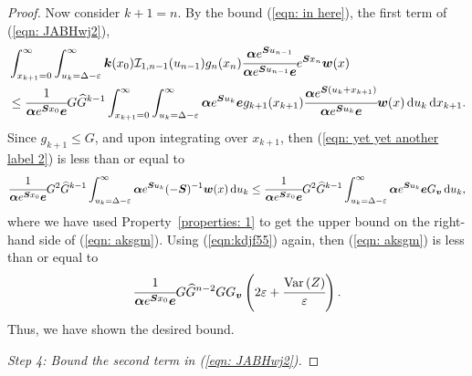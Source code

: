 \begin{proof}
		Now consider \(k+1=n\). By the bound (\ref{eqn: in here}), the first term of (\ref{eqn: JABHwj2}), 
		\begin{align}
			&\int_{x_{k+1}=0}^\infty \int_{u_k=\Delta-\varepsilon}^\infty \bs k(x_0)\mathcal I_{1,n-1}(u_{n-1}) g_{n}(x_{n})\cfrac{\bs \alpha e^{\bs{S}u_{n-1}}}{\bs \alpha e^{\bs{S}u_{n-1}}\bs e}e^{\bs{S}x_{n}}\bs w(x) %
			\\&\leq \cfrac{1}{\bs \alpha e^{\bs{S} x_0 }\bs e}G \widehat G^{k-1}
			\int_{x_{k+1}=0}^\infty \int_{u_k=\Delta-\varepsilon}^\infty \bs \alpha e^{\bs{S}u_k}\bs e g_{k+1}(x_{k+1}) \cfrac{\bs\alpha e^{\bs{S}(u_k+x_{k+1})}}{\bs \alpha e^{\bs{S}u_k}\bs e}\bs w(x)\wrt u_k \wrt x_{k+1}. \label{eqn: yet yet another label 2}
			\end{align}
			{Since \(g_{k+1}\leq G\), and upon integrating over \(x_{k+1}\), then (\ref{eqn: yet yet another label 2}) is less than or equal to }
			\begin{align}
			 \cfrac{1}{\boldsymbol \alpha e^{\boldsymbol{S} x_0 }\boldsymbol e}G^2\widehat G^{k-1}  
			\int_{u_k=\Delta-\varepsilon}^\infty \boldsymbol\alpha e^{\boldsymbol{S}u_k}(-\boldsymbol S)^{-1}{\boldsymbol w}(x) \, \mathrm{d} u_k 
			\leq \cfrac{1}{\boldsymbol \alpha e^{\boldsymbol{S} x_0 }\boldsymbol e}G^2 \widehat G^{k-1}  
			\int_{u_k=\Delta-\varepsilon}^\infty  \boldsymbol \alpha e^{\boldsymbol S u_k} \boldsymbol e G_{\boldsymbol v} \, \mathrm{d} u_k , \label{eqn: aksgm}
		\end{align}
		where we have used Property~\ref{properties: 1} to get the upper bound on the right-hand side of (\ref{eqn: aksgm}). Using (\ref{eqn:kdjf55}) again, then (\ref{eqn: aksgm}) is less than or equal to
		\begin{align}
			\cfrac{1}{\boldsymbol \alpha e^{\boldsymbol{S} x_0 }\boldsymbol e}G\widehat G^{n-2}   G G_{\boldsymbol v}\left(2\varepsilon + \cfrac{\mathrm{Var}\left(Z\right)}{\varepsilon}\right).
		\end{align}
		Thus, we have shown the desired bound. 

\emph{Step 4: Bound the second term in (\ref{eqn: JABHwj2}).}


\end{proof}
